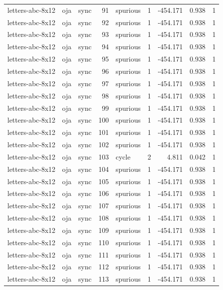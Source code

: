 \begin{tabular}{lllrlrrrr}
letters-abc-8x12 & oja & sync & 91 & spurious & 1 & -454.171 & 0.938 & 1 \\
letters-abc-8x12 & oja & sync & 92 & spurious & 1 & -454.171 & 0.938 & 1 \\
letters-abc-8x12 & oja & sync & 93 & spurious & 1 & -454.171 & 0.938 & 1 \\
letters-abc-8x12 & oja & sync & 94 & spurious & 1 & -454.171 & 0.938 & 1 \\
letters-abc-8x12 & oja & sync & 95 & spurious & 1 & -454.171 & 0.938 & 1 \\
letters-abc-8x12 & oja & sync & 96 & spurious & 1 & -454.171 & 0.938 & 1 \\
letters-abc-8x12 & oja & sync & 97 & spurious & 1 & -454.171 & 0.938 & 1 \\
letters-abc-8x12 & oja & sync & 98 & spurious & 1 & -454.171 & 0.938 & 1 \\
letters-abc-8x12 & oja & sync & 99 & spurious & 1 & -454.171 & 0.938 & 1 \\
letters-abc-8x12 & oja & sync & 100 & spurious & 1 & -454.171 & 0.938 & 1 \\
letters-abc-8x12 & oja & sync & 101 & spurious & 1 & -454.171 & 0.938 & 1 \\
letters-abc-8x12 & oja & sync & 102 & spurious & 1 & -454.171 & 0.938 & 1 \\
letters-abc-8x12 & oja & sync & 103 & cycle & 2 & 4.811 & 0.042 & 1 \\
letters-abc-8x12 & oja & sync & 104 & spurious & 1 & -454.171 & 0.938 & 1 \\
letters-abc-8x12 & oja & sync & 105 & spurious & 1 & -454.171 & 0.938 & 1 \\
letters-abc-8x12 & oja & sync & 106 & spurious & 1 & -454.171 & 0.938 & 1 \\
letters-abc-8x12 & oja & sync & 107 & spurious & 1 & -454.171 & 0.938 & 1 \\
letters-abc-8x12 & oja & sync & 108 & spurious & 1 & -454.171 & 0.938 & 1 \\
letters-abc-8x12 & oja & sync & 109 & spurious & 1 & -454.171 & 0.938 & 1 \\
letters-abc-8x12 & oja & sync & 110 & spurious & 1 & -454.171 & 0.938 & 1 \\
letters-abc-8x12 & oja & sync & 111 & spurious & 1 & -454.171 & 0.938 & 1 \\
letters-abc-8x12 & oja & sync & 112 & spurious & 1 & -454.171 & 0.938 & 1 \\
letters-abc-8x12 & oja & sync & 113 & spurious & 1 & -454.171 & 0.938 & 1 \\

\end{tabular}
